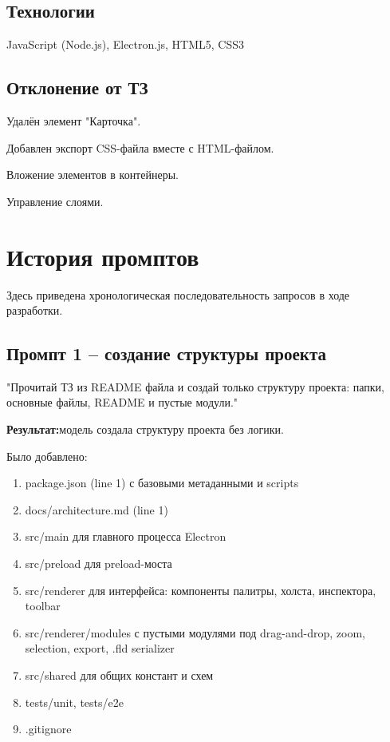\documentclass[14pt,a4paper]{extarticle}
\begin{document}
{{\subsection{Технологии}

JavaScript (Node.js), Electron.js, HTML5, CSS3

\subsection{Отклонение от ТЗ}

Удалён элемент "Карточка".

Добавлен экспорт CSS-файла вместе с HTML-файлом.

Вложение элементов в контейнеры.

Управление слоями.

\newpage
\section{История промптов}

Здесь приведена хронологическая последовательность запросов в ходе разработки.

\subsection{Промпт 1 -- создание структуры проекта}

"Прочитай ТЗ из README файла и создай только структуру проекта: папки, основные файлы, README и пустые модули."

\textbf{Результат:}модель создала структуру проекта без логики. 

Было добавлено:
\begin{enumerate}
    \item package.json (line 1) с базовыми метаданными и scripts
    \item docs/architecture.md (line 1)
    \item src/main для главного процесса Electron
    \item src/preload для preload-моста
    \item src/renderer для интерфейса: компоненты палитры, холста, инспектора, toolbar
    \item src/renderer/modules с пустыми модулями под drag-and-drop, zoom, selection, export, .fld serializer
    \item src/shared для общих констант и схем
    \item tests/unit, tests/e2e
    \item .gitignore
\end{enumerate}

}}
\end{document}
